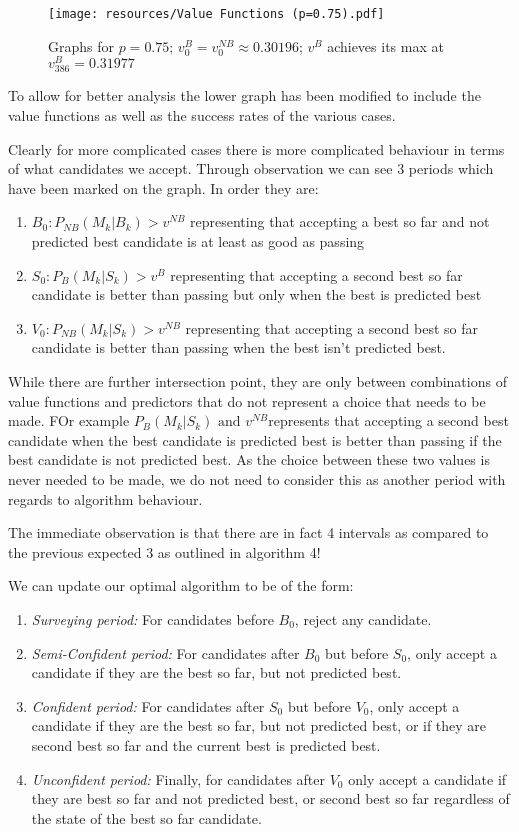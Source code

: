 \documentclass[a4paper,11pt]{article}
\begin{document}
\begin{figure}[H] 
    \centering
\texttt{[image: resources/Value Functions (p=0.75).pdf]}
    \caption{Graphs for $p = 0.75$; $v^B_0 = v_0^{NB}\approx0.30196$; $v^B$ achieves its max at $v^B_{386} = 0.31977$}
    \label{fig:value p = 0.75} 
\end{figure}

To allow for better analysis the lower graph has been modified to include the value functions as well as the success rates of the various cases.

Clearly for more complicated cases there is more complicated behaviour in terms of what candidates we accept. Through observation we can see 3 periods which have been marked on the graph. In order they are:
\begin{enumerate}
    \item $B_0: P_{NB}(M_k|B_k) > v^{NB}$ representing that accepting a best so far and not predicted best candidate is at least as good as passing
    \item $S_0: P_B(M_k|S_k) > v^{B}$ representing that accepting a second best so far candidate is better than passing but only when the best is predicted best
    \item $V_0: P_{NB}(M_k|S_k) > v^{NB}$ representing that accepting a second best so far candidate is better than passing when the best isn't predicted best.
\end{enumerate}

While there are further intersection point, they are only between combinations of value functions and predictors that do not represent a choice that needs to be made. FOr example $ P_B(M_k|S_k) \text{ and }v^{NB}$represents that accepting a second best candidate when the best candidate is predicted best is better than passing if the best candidate is not predicted best. As the choice between these two values is never needed to be made, we do not need to consider this as another period with regards to algorithm behaviour.

The immediate observation is that there are in fact 4 intervals as compared to the previous expected 3 as outlined in algorithm 4!

We can update our optimal algorithm to be of the form:
\begin{enumerate}
    \item \textit{Surveying period:} For candidates before $B_0$, reject any candidate.
    \item \textit{Semi-Confident period:} For candidates after $B_0$ but before $S_0$, only accept a candidate if they are the best so far, but not predicted best.
    \item \textit{Confident period:} For candidates after $S_0$ but before $V_0$, only accept a candidate if they are the best so far, but not predicted best, or if they are second best so far and the current best is predicted best.
    \item \textit{Unconfident period:} Finally, for candidates after $V_0$ only accept a candidate if they are best so far and not predicted best, or second best so far regardless of the state of the best so far candidate.
\end{enumerate}
\end{document}
